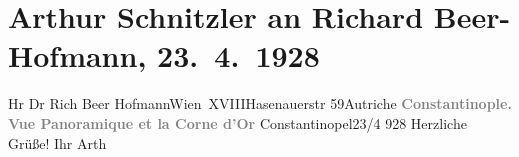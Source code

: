 

         
         \renewcommand{\erwaehntePersonen}{Personen: Richard Beer-Hofmann}
         \renewcommand{\erwaehnteOrte}{Orte: Goldenes Horn, Hasenauerstraße, Istanbul, Wien, XVIII., Währing, Österreich}
         \renewcommand{\erwaehnteWerke}{}
               \section[Arthur Schnitzler an Richard Beer-Hofmann, 23. 4. 1928]{ Arthur Schnitzler an Richard Beer-Hofmann, 23. 4. 1928}\nopagebreak{}\rehead{ }\begin{ledgroupsized}[t]{13cm}\normalsize\beginnumbering \toendnotes[C]{\smallbreak\pagebreak[2]} 
\pstart{}{\pb}Hr Dr Rich Beer Hofmann\pend{}\pstart{}Wien XVIII\pend{}\pstart{}Hasenauerstr 59\pend{}\pstart{}Autriche\pend{}{\bigskip}\pstart
           \noindent{}\centering{}{\pb}\textcolor{gray}{\textbf{Constantinople. Vue Panoramique et la Corne d’Or}}\pend
           \pstart
           \raggedleft{}{\pb}Constantinopel23/4 928\pend
           \pstart
           Herzliche Grüße!\pend
           \pstart Ihr \spacefill\mbox{Arth}\pend{}
         
         \endnumbering{}\end{ledgroupsized}  \newcommand{\dateiname}{L02499}\newcommand{\titel}{Arthur Schnitzler an Richard Beer-Hofmann, 23. 4. 1928}\newcommand{\editorInnen}{Martin Anton Müller und Gerd-Hermann Susen}
      